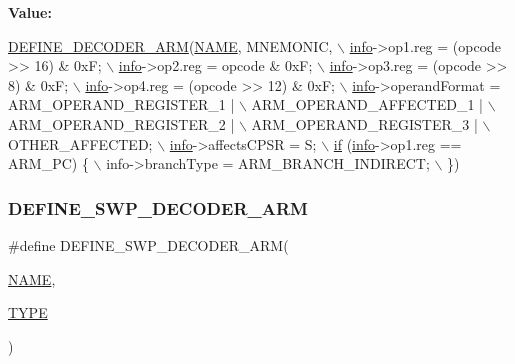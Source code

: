 {\bfseries Value\+:}
\begin{DoxyCode}
\mbox{\hyperlink{decoder-arm_8c_a4fe6e4683fda92c7774b0678f5ab95cc}{DEFINE\_DECODER\_ARM}}(\mbox{\hyperlink{inflate_8h_a164ea0159d5f0b5f12a646f25f99eceaa67bc2ced260a8e43805d2480a785d312}{NAME}}, MNEMONIC, \(\backslash\)
        \mbox{\hyperlink{libretro_8h_structretro__game__info}{info}}->op1.reg = (opcode >> 16) & 0xF; \(\backslash\)
        \mbox{\hyperlink{libretro_8h_structretro__game__info}{info}}->op2.reg = opcode & 0xF; \(\backslash\)
        \mbox{\hyperlink{libretro_8h_structretro__game__info}{info}}->op3.reg = (opcode >> 8) & 0xF; \(\backslash\)
        \mbox{\hyperlink{libretro_8h_structretro__game__info}{info}}->op4.reg = (opcode >> 12) & 0xF; \(\backslash\)
        \mbox{\hyperlink{libretro_8h_structretro__game__info}{info}}->operandFormat = ARM\_OPERAND\_REGISTER\_1 | \(\backslash\)
            ARM\_OPERAND\_AFFECTED\_1 | \(\backslash\)
            ARM\_OPERAND\_REGISTER\_2 | \(\backslash\)
            ARM\_OPERAND\_REGISTER\_3 | \(\backslash\)
            OTHER\_AFFECTED; \(\backslash\)
        \mbox{\hyperlink{libretro_8h_structretro__game__info}{info}}->affectsCPSR = S; \(\backslash\)
        \mbox{\hyperlink{isa-arm_8c_a0736bf8f9c6b829a423d7d7a43b781e8}{if}} (\mbox{\hyperlink{libretro_8h_structretro__game__info}{info}}->op1.reg == ARM\_PC) \{ \(\backslash\)
            info->branchType = ARM\_BRANCH\_INDIRECT; \(\backslash\)
        \})
\end{DoxyCode}
\mbox{\label{decoder-arm_8c_a808a5c0ec2d14ddd88829aba72bb1b05}} 
\subsubsection{\texorpdfstring{D\+E\+F\+I\+N\+E\+\_\+\+S\+W\+P\+\_\+\+D\+E\+C\+O\+D\+E\+R\+\_\+\+A\+RM}{DEFINE\_SWP\_DECODER\_ARM}}
{\footnotesize\ttfamily \#define D\+E\+F\+I\+N\+E\+\_\+\+S\+W\+P\+\_\+\+D\+E\+C\+O\+D\+E\+R\+\_\+\+A\+RM(\begin{DoxyParamCaption}\item[{}]{\mbox{\hyperlink{inflate_8h_a164ea0159d5f0b5f12a646f25f99eceaa67bc2ced260a8e43805d2480a785d312}{N\+A\+ME}},  }\item[{}]{\mbox{\hyperlink{inflate_8h_a164ea0159d5f0b5f12a646f25f99eceaab47ea8bb955afd0adc0ef98517dd6084}{T\+Y\+PE}} }\end{DoxyParamCaption})}

